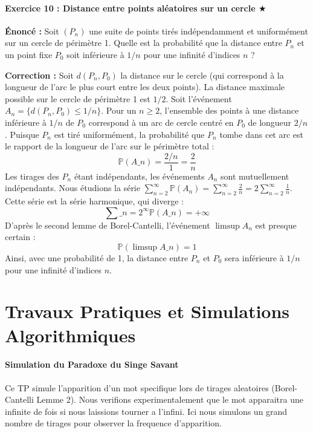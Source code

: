 \documentclass[11pt,a4paper]{article}
\begin{document}
\subsection*{Exercice 10 : Distance entre points aléatoires sur un cercle \quad $\bigstar$}





\textbf{Énoncé :}
Soit $(P_n)$ une suite de points tirés indépendamment et uniformément sur un cercle de périmètre 1.
Quelle est la probabilité que la distance entre $P_n$ et un point fixe $P_0$ soit inférieure à $1/n$ pour une infinité d'indices $n$ ?

\textbf{Correction :}
Soit $d(P_n, P_0)$ la distance sur le cercle (qui correspond à la longueur de l'arc le plus court entre les deux points).
La distance maximale possible sur le cercle de périmètre 1 est $1/2$.
Soit l'événement $A_n = \{ d(P_n, P_0) \le 1/n \}$.
Pour un $n \ge 2$, l'ensemble des points à une distance inférieure à $1/n$ de $P_0$ correspond à un arc de cercle centré en $P_0$ de longueur $2/n$.
Puisque $P_n$ est tiré uniformément, la probabilité que $P_n$ tombe dans cet arc est le rapport de la longueur de l'arc sur le périmètre total :
$$ \mathbb{P}(A\_n) = \frac{2/n}{1} = \frac{2}{n} $$
Les tirages des $P_n$ étant indépendants, les événements $A_n$ sont mutuellement indépendants.
Nous étudions la série $\sum_{n=2}^\infty \mathbb{P}(A_n) = \sum_{n=2}^\infty \frac{2}{n} = 2 \sum_{n=2}^\infty \frac{1}{n}$.
Cette série est la série harmonique, qui diverge :
$$ \sum\_{n=2}^\infty \mathbb{P}(A\_n) = +\infty $$
D'après le second lemme de Borel-Cantelli, l'événement $\limsup A_n$ est presque certain :
$$ \mathbb{P}(\limsup A\_n) = 1 $$
Ainsi, avec une probabilité de 1, la distance entre $P_n$ et $P_0$ sera inférieure à $1/n$ pour une infinité d'indices $n$.


\newpage
\part{Travaux Pratiques et Simulations Algorithmiques}

\subsection*{Simulation du Paradoxe du Singe Savant}
Ce TP simule l'apparition d'un mot specifique lors de tirages aleatoires (Borel-Cantelli Lemme 2).
Nous verifions experimentalement que le mot apparaitra une infinite de fois si nous laissions tourner a l'infini.
Ici nous simulons un grand nombre de tirages pour observer la frequence d'apparition.
\end{document}

